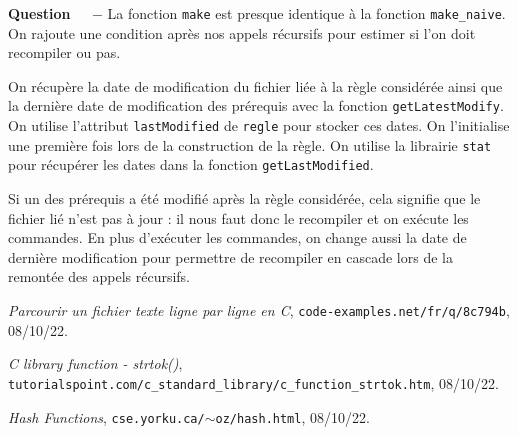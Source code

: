 \documentclass[11pt]{report}
\newcounter{question}[section]
\newenvironment{question}[1][]{\refstepcounter{question}\par\medskip
   \noindent\textbf{Question~\thequestion ~ $-$} \rmfamily}{}
\begin{document}
\begin{question} %
La fonction \texttt{make} est presque identique à la fonction \texttt{make\_naive}. On rajoute une condition après nos appels récursifs pour estimer si l'on doit recompiler ou pas.

On récupère la date de modification du fichier liée à la règle considérée ainsi que la dernière date de modification des prérequis avec la fonction \texttt{getLatestModify}.
On utilise l'attribut \texttt{lastModified} de \texttt{regle} pour stocker ces dates. On l'initialise une première fois lors de la construction de la règle. On utilise la librairie \texttt{stat} pour récupérer les dates dans la fonction \texttt{getLastModified}.

Si un des prérequis a été modifié après la règle considérée, cela signifie que le fichier lié n'est pas à jour : il nous faut donc le recompiler et on exécute les commandes. En plus d'exécuter les commandes, on change aussi la date de dernière modification pour permettre de recompiler en cascade lors de la remontée des appels récursifs.

\end{question}





\begin{thebibliography}{99}
  \textit{Parcourir un fichier texte ligne par ligne en C},
  \texttt{code-examples.net/fr/q/8c794b},
  08/10/22.

  \textit{C library function - strtok()},
  \texttt{tutorialspoint.com/c\_standard\_library/c\_function\_strtok.htm},
  08/10/22.
  
  \textit{Hash Functions},
  \texttt{cse.yorku.ca/$\sim$oz/hash.html},
  08/10/22.


\end{thebibliography}
\end{document}
